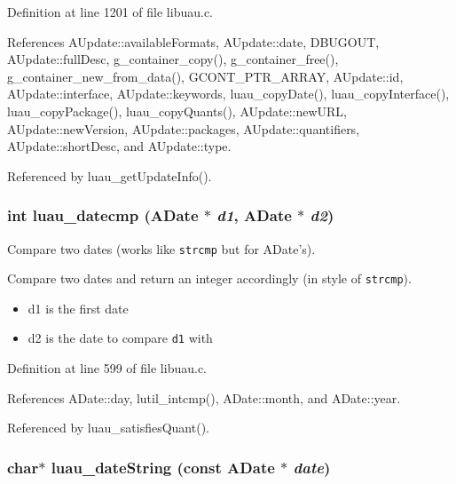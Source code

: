 Definition at line 1201 of file libuau.c.

References AUpdate::available\-Formats, AUpdate::date, DBUGOUT, AUpdate::full\-Desc, g\_\-container\_\-copy(), g\_\-container\_\-free(), g\_\-container\_\-new\_\-from\_\-data(), GCONT\_\-PTR\_\-ARRAY, AUpdate::id, AUpdate::interface, AUpdate::keywords, luau\_\-copy\-Date(), luau\_\-copy\-Interface(), luau\_\-copy\-Package(), luau\_\-copy\-Quants(), AUpdate::new\-URL, AUpdate::new\-Version, AUpdate::packages, AUpdate::quantifiers, AUpdate::short\-Desc, and AUpdate::type.

Referenced by luau\_\-get\-Update\-Info().
\subsubsection{\setlength{\rightskip}{0pt plus 5cm}int luau\_\-datecmp ({\bf ADate} $\ast$ {\em d1}, {\bf ADate} $\ast$ {\em d2})}\label{libuau_8h_a76}


Compare two dates (works like {\tt strcmp} but for ADate's). 

Compare two dates and return an integer accordingly (in style of {\tt strcmp}).

\begin{itemize}
\item d1 is the first date \item d2 is the date to compare {\tt d1} with 
\end{itemize}


Definition at line 599 of file libuau.c.

References ADate::day, lutil\_\-intcmp(), ADate::month, and ADate::year.

Referenced by luau\_\-satisfies\-Quant().
\subsubsection{\setlength{\rightskip}{0pt plus 5cm}char$\ast$ luau\_\-date\-String (const {\bf ADate} $\ast$ {\em date})}\label{libuau_8h_a62}


